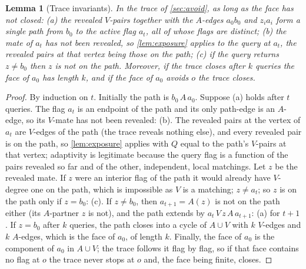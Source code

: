 \documentclass[11pt,a4paper]{article}
\theoremstyle{plain}
\newtheorem{lemma}[theorem]{Lemma}
\theoremstyle{definition}
\theoremstyle{remark}
\begin{document}
\label{pf:trace}
\begin{lemma}[Trace invariants]\label{lem:trace}
In the trace of \cref{sec:avoid}, as long as the face has not closed: (a) the revealed $V$-pairs together with the $A$-edges $a_0b_0$ and $z_ia_i$ form a single path from $b_0$ to the active flag $a_t$, all of whose flags are distinct; (b) the mate of $a_t$ has not been revealed, so \cref{lem:exposure} applies to the query at $a_t$, the revealed pairs at that vertex being those on the path; (c) if the query returns $z\ne b_0$ then $z$ is not on the path. Moreover, if the trace closes after $k$ queries the face of $a_0$ has length $k$, and if the face of $a_0$ avoids $o$ the trace closes.
\end{lemma}
\begin{proof}
By induction on $t$. Initially the path is $b_0\,A\,a_0$. Suppose (a) holds after $t$ queries. The flag $a_t$ is an endpoint of the path and its only path-edge is an $A$-edge, so its $V$-mate has not been revealed: (b). The revealed pairs at the vertex of $a_t$ are $V$-edges of the path (the trace reveals nothing else), and every revealed pair is on the path, so \cref{lem:exposure} applies with $Q$ equal to the path's $V$-pairs at that vertex; adaptivity is legitimate because the query flag is a function of the pairs revealed so far and of the other, independent, local matchings. Let $z$ be the revealed mate. If $z$ were an interior flag of the path it would already have $V$-degree one on the path, which is impossible as $V$ is a matching; $z\ne a_t$; so $z$ is on the path only if $z=b_0$: (c). If $z\ne b_0$, then $a_{t+1}=A(z)$ is not on the path either (its $A$-partner $z$ is not), and the path extends by $a_t\,V\,z\,A\,a_{t+1}$: (a) for $t+1$. If $z=b_0$ after $k$ queries, the path closes into a cycle of $A\cup V$ with $k$ $V$-edges and $k$ $A$-edges, which is the face of $a_0$, of length $k$. Finally, the face of $a_0$ is the component of $a_0$ in $A\cup V$; the trace follows it flag by flag, so if that face contains no flag at $o$ the trace never stops at $o$ and, the face being finite, closes.
\end{proof}
\end{document}

